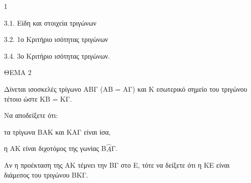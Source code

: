 \begin{ylh}{1}
    \item 3.1. Είδη και στοιχεία τριγώνων
    \item 3.2. 1ο Κριτήριο ισότητας τριγώνων
    \item 3.4. 3ο Κριτήριο ισότητας τριγώνων.
\end{ylh}

ΘΕΜΑ 2

Δίνεται ισοσκελές τρίγωνο ΑΒΓ (ΑΒ = ΑΓ) και Κ εσωτερικό σημείο του τριγώνου τέτοιο ώστε ΚΒ = ΚΓ.

\begin{alist}
\item Να αποδείξετε ότι:
\begin{rlist}
\item τα τρίγωνα ΒΑΚ και ΚΑΓ είναι ίσα, 
\item η ΑΚ είναι διχοτόμος της γωνίας Β$\widehat{Α}$Γ. 
\end{rlist}

\item Αν η προέκταση της ΑΚ τέμνει την ΒΓ στο Ε, τότε να δείξετε ότι η ΚΕ είναι διάμεσος του τριγώνου ΒΚΓ. 

\begin{center}
\end{center}
\end{alist}
